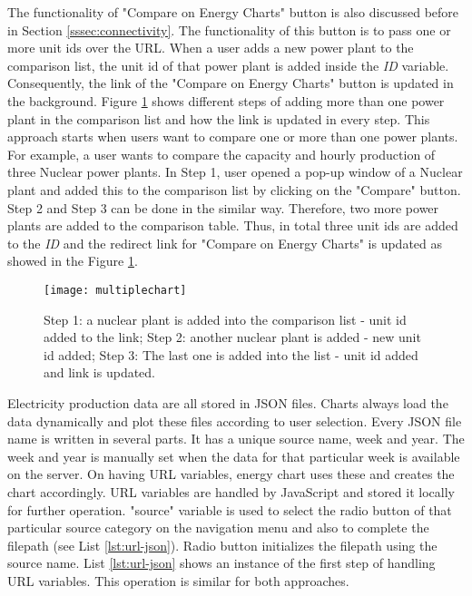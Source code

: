 The functionality of "Compare on Energy Charts" button is also discussed before in Section \ref{sssec:connectivity}. The functionality of this button is to pass one or more unit ids over the URL. When a user adds a new power plant to the comparison list, the unit id of that power plant is added inside the \textit{ID} variable. Consequently, the link of the "Compare on Energy Charts" button is updated in the background. Figure \ref{fig:stepsPP} shows different steps of adding more than one power plant in the comparison list and how the link is updated in every step. This approach starts when users want to compare one or more than one power plants. For example, a user wants to compare the capacity and hourly production of three Nuclear power plants. In Step 1, user opened a pop-up window of a Nuclear plant and added this to the comparison list by clicking on the "Compare" button. Step 2 and Step 3 can be done in the similar way. Therefore, two more power plants are added to the comparison table. Thus, in total three unit ids are added to the \textit{ID} and the redirect link for "Compare on Energy Charts" is updated as showed in the Figure \ref{fig:stepsPP}. 

\begin{figure}
\centering
\texttt{[image: multiplechart]}
\caption[Steps of adding power plants to the comparison list]{Step 1: a nuclear plant is added into the comparison list - unit id added to the link; Step 2: another nuclear plant is added - new unit id added; Step 3: The last one is added into the list - unit id added and link is updated.}
\label{fig:stepsPP}
\end{figure}

Electricity production data are all stored in JSON files. Charts always load the data dynamically and plot these files according to user selection. Every JSON file name is written in several parts. It has a unique source name, week and year. The week and year is manually set when the data for that particular week is available on the server. On having URL variables, energy chart uses these and creates the chart accordingly. URL variables are handled by JavaScript and stored it locally for further operation. "source" variable is used to select the radio button of that particular source category on the navigation menu and also to complete the filepath (see List \ref{lst:url-json}). Radio button initializes the filepath using the source name. List \ref{lst:url-json} shows an instance of the first step of handling URL variables. This operation is similar for both approaches. 

